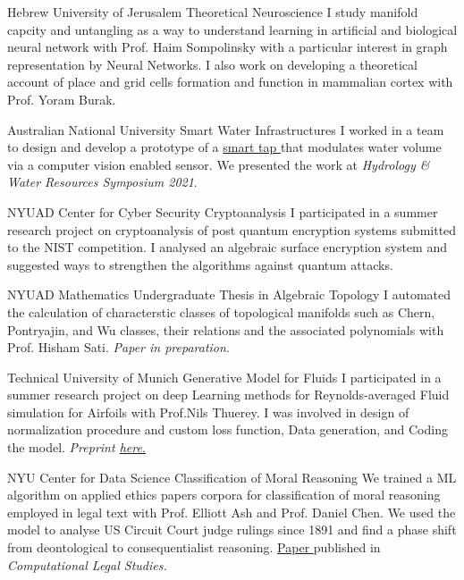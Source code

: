 
{Hebrew University of Jerusalem}
{Theoretical Neuroscience}
{
	I study manifold capcity and untangling as a way to understand learning in artificial and biological neural network with Prof. Haim Sompolinsky with a particular interest in graph representation by Neural Networks. I also work on developing a theoretical account of place and grid cells formation and function in mammalian cortex with Prof. Yoram Burak.  
}

{Australian National University}
{Smart Water Infrastructures}
{
	I worked in a team to design and develop a prototype of a 
	\href{http://tappyvision.herokuapp.com}{
		smart tap
	}that modulates water volume via a computer vision enabled sensor. We presented the work at \textit{Hydrology \& Water Resources Symposium 2021}.
}

{NYUAD Center for Cyber Security}
{Cryptoanalysis}
{
	I participated in a summer research project on cryptoanalysis of post quantum encryption systems submitted to the NIST competition. I analysed an algebraic surface encryption system and suggested ways to strengthen the algorithms against quantum attacks.
}

{NYUAD Mathematics}
{Undergraduate Thesis in Algebraic Topology}
{
	I automated the calculation of characterstic classes of topological manifolds such as Chern, Pontryajin, and Wu classes, their relations and the associated polynomials with Prof. Hisham Sati. \textit{Paper in preparation}.
}

{Technical University of Munich}
{Generative Model for Fluids}
{
	I participated in a summer research project on deep Learning methods for Reynolds-averaged Fluid simulation for Airfoils with Prof.Nils Thuerey. I was involved in design of normalization procedure and custom loss function, Data generation, and Coding the model. 
	\textit{ Preprint
		\href{https://www.researchgate.net/publication/328418525_Well_how_accurate_is_it_A_Study_of_Deep_Learning_Methods_for_Reynolds-Averaged_Navier-Stokes_Simulations}{
		here.
		}
	}
}

{NYU Center for Data Science}
{Classification of Moral Reasoning}
{
	We trained a ML algorithm on applied ethics papers corpora for classification of moral reasoning employed in legal text with Prof. Elliott Ash and Prof. Daniel Chen. We used the model to analyse US Circuit Court judge rulings since 1891 and find a phase shift from deontological to consequentialist reasoning.
	\href{https://papers.ssrn.com/sol3/papers.cfm?abstract_id=3205286}{
		Paper
		}published in \textit{Computational Legal Studies.}
}
